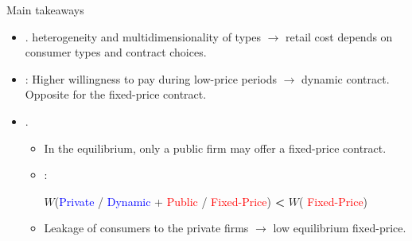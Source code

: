 \documentclass{class}
\begin{document}

\begin{frame}{Main takeaways}


\begin{itemize}

\item {}. heterogeneity and multidimensionality of types $\rightarrow$ retail cost depends on consumer types and contract choices.


\vfill

\item {}: Higher willingness to pay during low-price periods $\rightarrow$ dynamic contract. Opposite for the fixed-price contract.

\vfill

\item {}.

\vfill

\begin{itemize}
    \item In the equilibrium, only a public firm may offer a fixed-price contract. \vfill

\item {}: \vfill

    \begin{center}
    $W$(\textcolor{blue}{Private} / \textcolor{blue}{Dynamic} + \textcolor{red}{Public} / \textcolor{red}{Fixed-Price})  { \textbf{  < }} $W$( \textcolor{red}{Fixed-Price})
   \end{center}

\vfill

\item Leakage of consumers to the private firms $\rightarrow$ low equilibrium fixed-price.

    \end{itemize}

\end{itemize}


\end{frame}


\end{document}
